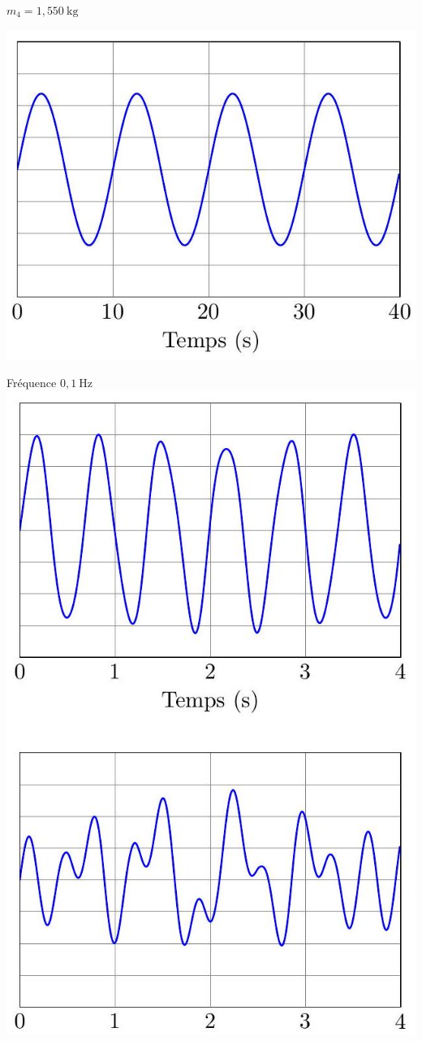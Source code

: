 \documentclass[10pt]{article}
\begin{document}
$m_{4}=1,550 \mathrm{~kg}$

\begin{center}
\includegraphics[max width=\textwidth]{2022_12_31_ed674c1a831ea1bff3a0g-07(1)}
\end{center}

Fréquence $0,1 \mathrm{~Hz}$
\includegraphics[max width=\textwidth, center]{2022_12_31_ed674c1a831ea1bff3a0g-07(2)}
\end{document}
